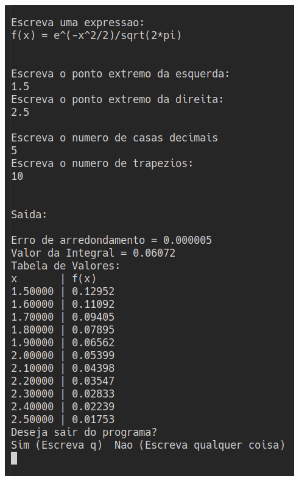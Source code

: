\documentclass[14pt, letterpaper]{article}
\begin{document}
\begin{center}
  \includegraphics[scale=0.5]{exemplo}
\end{center}
\end{document}
